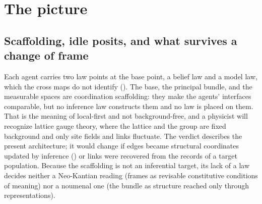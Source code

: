 \section{The picture}
\label{comp:ch14-picture}

\subsection{Scaffolding, idle posits, and what survives a change of frame}

Each agent carries two law points at the base point, a belief law and a model law, which the cross maps
do not identify (). The base, the principal bundle, and the measurable
spaces are coordination scaffolding: they make the agents' interfaces comparable, but no inference law
constructs them and no law is placed on them. That is the meaning of local-first and not
background-free, and a physicist will recognize lattice gauge theory, where the lattice and the group
are fixed background and only site fields and links fluctuate. The verdict describes the present
architecture; it would change if edges became structural coordinates updated by inference
() or links were recovered from the records of a target population. Because the scaffolding
is not an inferential target, its lack of a law decides neither a Neo-Kantian reading (frames as
revisable constitutive conditions of meaning) nor a noumenal one (the bundle as structure reached only
through representations).

